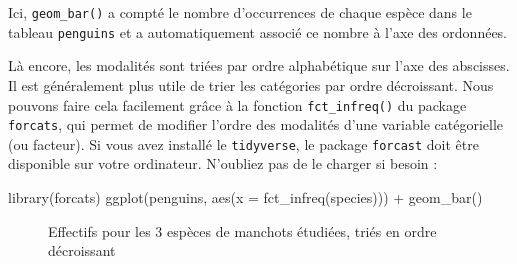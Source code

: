 \documentclass[
  a4paper,
  DIV=11,
  numbers=noendperiod,
  oneside]{scrreprt}
\newenvironment{Shaded}{}{}
\newcommand{\AttributeTok}[1]{\textcolor[rgb]{0.84,0.23,0.29}{#1}}
\newcommand{\FunctionTok}[1]{\textcolor[rgb]{0.44,0.26,0.76}{#1}}
\newcommand{\NormalTok}[1]{\textcolor[rgb]{0.14,0.16,0.18}{#1}}
\newcommand{\SpecialCharTok}[1]{\textcolor[rgb]{0.00,0.36,0.77}{#1}}
\begin{document}
Ici, \texttt{geom\_bar()} a compté le nombre d'occurrences de chaque
espèce dans le tableau \texttt{penguins} et a automatiquement associé ce
nombre à l'axe des ordonnées.

Là encore, les modalités sont triées par ordre alphabétique sur l'axe
des abscisses. Il est généralement plus utile de trier les catégories
par ordre décroissant. Nous pouvons faire cela facilement grâce à la
fonction \texttt{fct\_infreq()} du package \texttt{forcats}, qui permet
de modifier l'ordre des modalités d'une variable catégorielle (ou
facteur). Si vous avez installé le \texttt{tidyverse}, le package
\texttt{forcast} doit être disponible sur votre ordinateur. N'oubliez
pas de le charger si besoin :

\begin{Shaded}
\begin{Highlighting}[]
\FunctionTok{library}\NormalTok{(forcats)}
\FunctionTok{ggplot}\NormalTok{(penguins, }\FunctionTok{aes}\NormalTok{(}\AttributeTok{x =} \FunctionTok{fct\_infreq}\NormalTok{(species))) }\SpecialCharTok{+}
  \FunctionTok{geom\_bar}\NormalTok{()}
\end{Highlighting}
\end{Shaded}

\begin{figure}[H]


\caption{\label{fig-bpspecies-infreq}Effectifs pour les 3 espèces de
manchots étudiées, triés en ordre décroissant}

\end{figure}%
\end{document}
